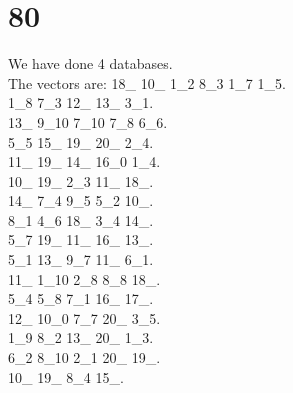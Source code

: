 \chapter{80}
\indent We have done 4 databases.\\
The vectors are:
18\_ 10\_ 1\_2 8\_3 1\_7 1\_5.\\1\_8 7\_3 12\_ 13\_ 3\_1.\\13\_ 9\_10 7\_10 7\_8 6\_6.\\5\_5 15\_ 19\_ 20\_ 2\_4.\\11\_ 19\_ 14\_ 16\_0 1\_4.\\10\_ 19\_ 2\_3 11\_ 18\_.\\14\_ 7\_4 9\_5 5\_2 10\_.\\8\_1 4\_6 18\_ 3\_4 14\_.\\5\_7 19\_ 11\_ 16\_ 13\_.\\5\_1 13\_ 9\_7 11\_ 6\_1.\\11\_ 1\_10 2\_8 8\_8 18\_.\\5\_4 5\_8 7\_1 16\_ 17\_.\\12\_ 10\_0 7\_7 20\_ 3\_5.\\1\_9 8\_2 13\_ 20\_ 1\_3.\\6\_2 8\_10 2\_1 20\_ 19\_.\\10\_ 19\_ 8\_4 15\_.\\